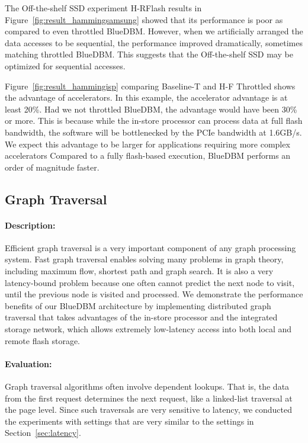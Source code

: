 The Off-the-shelf SSD experiment H-RFlash results in
Figure~\ref{fig:result_hammingsamsung} showed that its performance is poor as
compared to even throttled BlueDBM. However, when we artificially arranged the
data accesses to be sequential, the performance improved dramatically, sometimes
matching throttled BlueDBM. This suggests that the Off-the-shelf SSD may be optimized for sequential accesses.

Figure~\ref{fig:result_hammingisp} comparing Baseline-T and H-F Throttled shows the advantage of accelerators. In this example, the accelerator advantage is at least 20\%. Had we not throttled BlueDBM, the advantage would have been 30\% or more. This is because while the in-store processor can process data at full flash bandwidth, the software will be bottlenecked by the PCIe bandwidth at 1.6GB/s. We expect this advantage to be larger for applications requiring more complex accelerators
Compared to a fully flash-based execution, BlueDBM performs an order
of magnitude faster.

\subsection{Graph Traversal}

\paragraph{Description:}
Efficient graph traversal is a very important component of any graph processing
system. Fast graph traversal enables solving many problems in graph theory,
including maximum flow, shortest path and graph search. It is also a very
latency-bound problem because one often cannot predict the next node to visit,
until the previous node is visited and processed. We demonstrate the performance
benefits of our BlueDBM architecture by implementing distributed graph
traversal that takes advantages of the in-store processor and the integrated
storage network, which allows extremely low-latency access into both local and
remote flash storage.  

\paragraph{Evaluation:}
Graph traversal algorithms often involve dependent lookups. That is, the data from the first request determines the next request, like a linked-list traversal at the page level. Since such traversals are very sensitive to latency, we conducted the experiments with settings that are very similar to the settings in Section~\ref{sec:latency}.

